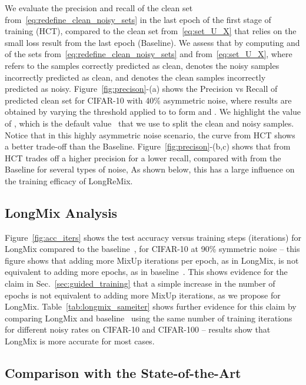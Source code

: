\documentclass{article}
\begin{document}
We evaluate the precision and recall of the clean set  from~\eqref{eq:redefine_clean_noisy_sets} in the last epoch of the first stage of training (HCT), compared to the clean set  from~\eqref{eq:set_U_X} that relies on the small loss result from the last epoch (Baseline). 
We assess that by computing  and  of the sets  from~\eqref{eq:redefine_clean_noisy_sets} and  from~\eqref{eq:set_U_X}, where  refers to the samples correctly predicted as clean,   denotes the noisy samples incorrectly predicted as clean, and  denotes the clean samples incorrectly predicted as noisy.
Figure~\ref{fig:precison}-(a) shows the Precision vs Recall of predicted clean set for CIFAR-10 with 40\% asymmetric noise, where results are obtained by varying the threshold  applied to   to form  and . 
We highlight the value of , which is the default value~\cite{li2020dividemix} that we use to split the clean and noisy samples. Notice that in this highly asymmetric noise scenario, the curve from HCT shows a better trade-off than the Baseline.
Figure~\ref{fig:precison}-(b,c) shows that  from HCT trades off a higher precision for a lower recall, compared with  from the Baseline for several types of noise,  As shown below, this has a large influence on the training efficacy of LongReMix. 


\subsection{LongMix Analysis}

Figure~\ref{fig:acc_iters} shows the test accuracy versus training steps (iterations) for LongMix compared to the baseline~\cite{li2020dividemix}, for CIFAR-10 at 90\% symmetric noise -- this figure shows that adding more MixUp iterations per epoch, as in LongMix, is not equivalent to adding more epochs, as in baseline~\cite{li2020dividemix}.
This shows evidence for the claim in Sec.~\ref{sec:guided_training} that a simple increase in the number of epochs is not equivalent to adding more MixUp iterations, as we propose for LongMix.
Table~\ref{tab:longmix_sameiter} shows further evidence for this claim by comparing LongMix and baseline~\cite{li2020dividemix} using the same number of training iterations for different noisy rates on CIFAR-10 and CIFAR-100 -- results show that LongMix is more accurate for most cases. 



\subsection{Comparison with the State-of-the-Art}
\end{document}
